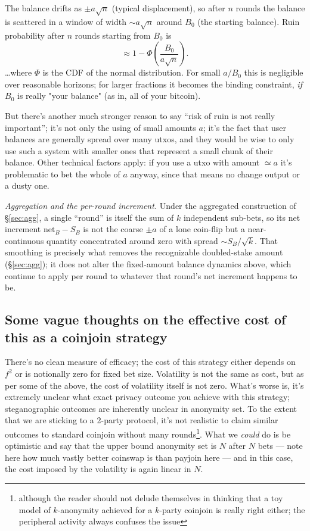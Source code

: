 \documentclass[11pt]{article}
\begin{document}
 The
balance drifts as $\pm a\sqrt{n}$ (typical displacement), so after $n$ rounds
the balance is scattered in a window of width $\sim a\sqrt{n}$ around $B_0$ (the starting balance). Ruin probability after $n$ rounds starting from $B_0$ is
$$
\approx 1 - \Phi\!\left(\frac{B_0}{a\sqrt{n}}\right).
$$
\ldots where $\Phi$ is the CDF of the normal distribution. For small $a/B_0$ this is negligible over reasonable horizons; for larger fractions it becomes the binding constraint, \emph{if} $B_0$ is really "your balance" (as in, all of your bitcoin).

But there's another much stronger reason to say ``risk of ruin is not really important''; it's not only the using of small amounts $a$; it's the fact that user balances are generally spread over many utxos, and they would be wise to only use such a system with smaller ones that represent a small chunk of their balance. Other technical factors apply: if you use a utxo with amount $\simeq a$ it's problematic to bet the whole of $a$ anyway, since that means no change output or a dusty one.

\medskip\noindent\emph{Aggregation and the per-round increment.} Under the aggregated construction of \S\ref{sec:agg}, a single ``round'' is itself the sum of $k$ independent sub-bets, so its net increment $\mathrm{net}_B - S_B$ is not the coarse $\pm a$ of a lone coin-flip but a near-continuous quantity concentrated around zero with spread $\sim S_B/\sqrt{k}$. That smoothing is precisely what removes the recognizable doubled-stake amount (\S\ref{sec:agg}); it does not alter the fixed-amount balance dynamics above, which continue to apply per round to whatever that round's net increment happens to be.

\subsection{Some vague thoughts on the effective cost of this as a coinjoin strategy}

There's no clean measure of efficacy; the cost of this strategy either depends on $f^2$ or is notionally zero for fixed bet size. Volatility is not the same as cost, but as per some of the above, the cost of volatility itself is not zero. What's worse is, it's extremely unclear what exact privacy outcome you achieve with this strategy; steganographic outcomes are inherently unclear in anonymity set. To the extent that we are sticking to a 2-party protocol, it's not realistic to claim similar outcomes to standard coinjoin without many rounds\footnote{although the reader should not delude themselves in thinking that a toy model of $k$-anonymity achieved for a $k$-party coinjoin is really right either; the peripheral activity always confuses the issue}. What we \emph{could} do is be optimistic and say that the upper bound anonymity set is $N$ after $N$ bets --- note here how much vastly better coinswap is than payjoin here --- and in this case, the cost imposed by the volatility is again linear in $N$.
\end{document}
